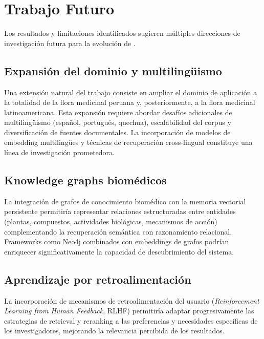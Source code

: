 
\section{Trabajo Futuro}
\label{sec:future_work}

Los resultados y limitaciones identificados sugieren múltiples direcciones de investigación futura para la evolución de \sirca{}.

\subsection{Expansión del dominio y multilingüismo}
\label{subsec:fw_domain}

Una extensión natural del trabajo consiste en ampliar el dominio de aplicación a la totalidad de la flora medicinal peruana y, posteriormente, a la flora medicinal latinoamericana. Esta expansión requiere abordar desafíos adicionales de multilingüismo (español, portugués, quechua), escalabilidad del corpus y diversificación de fuentes documentales. La incorporación de modelos de embedding multilingües y técnicas de recuperación cross-lingual constituye una línea de investigación prometedora.

\subsection{Knowledge graphs biomédicos}
\label{subsec:fw_kg}

La integración de grafos de conocimiento biomédico con la memoria vectorial persistente permitiría representar relaciones estructuradas entre entidades (plantas, compuestos, actividades biológicas, mecanismos de acción) complementando la recuperación semántica con razonamiento relacional. Frameworks como Neo4j combinados con embeddings de grafos podrían enriquecer significativamente la capacidad de descubrimiento del sistema.

\subsection{Aprendizaje por retroalimentación}
\label{subsec:fw_feedback}

La incorporación de mecanismos de retroalimentación del usuario (\textit{Reinforcement Learning from Human Feedback}, RLHF) permitiría adaptar progresivamente las estrategias de retrieval y reranking a las preferencias y necesidades específicas de los investigadores, mejorando la relevancia percibida de los resultados.

